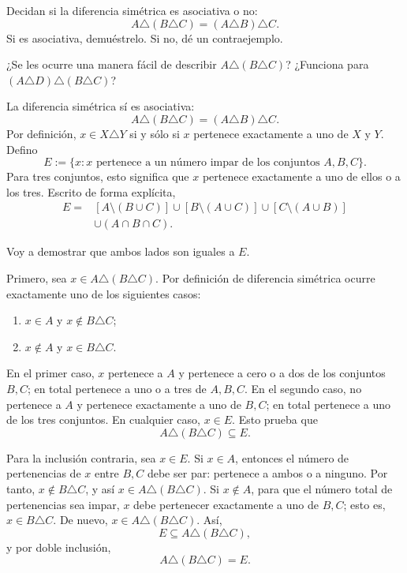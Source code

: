 \documentclass[11pt]{article}
\begin{document}
Decidan si la diferencia simétrica es asociativa o no:
\[
A\triangle(B\triangle C)=(A\triangle B)\triangle C.
\]
Si es asociativa, demuéstrelo. Si no, dé un contraejemplo.

¿Se les ocurre una manera fácil de describir $A\triangle(B\triangle C)$? ¿Funciona para $(A\triangle D)\triangle(B\triangle C)$?

\bigskip

La diferencia simétrica sí es asociativa:
\[
\boxed{A\triangle(B\triangle C)=(A\triangle B)\triangle C}.
\]
Por definición, $x\in X\triangle Y$ si y sólo si $x$ pertenece exactamente a
uno de $X$ y $Y$. Defino
\[
E:=\{x:x\text{ pertenece a un número impar de los conjuntos }A,B,C\}.
\]
Para tres conjuntos, esto significa que $x$ pertenece exactamente a uno de ellos o a los tres. Escrito de forma explícita,
\begin{align*}
E={}&[A\setminus(B\cup C)]\cup[B\setminus(A\cup C)]
\cup[C\setminus(A\cup B)]\\
&\cup(A\cap B\cap C).
\end{align*}

Voy a demostrar que ambos lados son iguales a $E$.

Primero, sea $x\in A\triangle(B\triangle C)$. Por definición de diferencia
simétrica ocurre exactamente uno de los siguientes casos:
\begin{enumerate}
  \item $x\in A$ y $x\notin B\triangle C$;
  \item $x\notin A$ y $x\in B\triangle C$.
\end{enumerate}
En el primer caso, $x$ pertenece a $A$ y pertenece a cero o a dos de los
conjuntos $B,C$; en total pertenece a uno o a tres de $A,B,C$. En el segundo
caso, no pertenece a $A$ y pertenece exactamente a uno de $B,C$; en total
pertenece a uno de los tres conjuntos. En cualquier caso, $x\in E$. Esto prueba
que
\[
A\triangle(B\triangle C)\subseteq E.
\]

Para la inclusión contraria, sea $x\in E$. Si $x\in A$, entonces el número de
pertenencias de $x$ entre $B,C$ debe ser par: pertenece a ambos o a ninguno.
Por tanto, $x\notin B\triangle C$, y así
$x\in A\triangle(B\triangle C)$. Si $x\notin A$, para que el número total de
pertenencias sea impar, $x$ debe pertenecer exactamente a uno de $B,C$; esto es,
$x\in B\triangle C$. De nuevo, $x\in A\triangle(B\triangle C)$. Así,
\[
E\subseteq A\triangle(B\triangle C),
\]
y por doble inclusión,
\[
A\triangle(B\triangle C)=E.
\]
\end{document}
